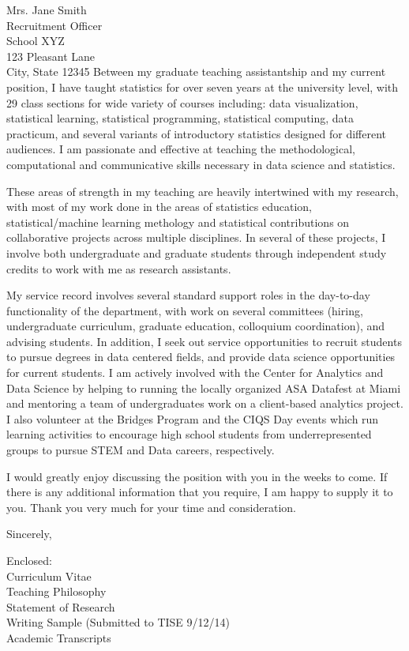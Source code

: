 \documentclass[11pt]{letter}\usepackage[]{graphicx}\usepackage[]{color}
\begin{document}
\begin{letter}{Mrs. Jane Smith \\
Recruitment Officer \\
School XYZ \\
123 Pleasant Lane \\
City, State 12345}
Between my graduate teaching assistantship and my current position,  I have taught statistics for over seven years at the university level, with 29 class sections for wide variety of courses including: data visualization, statistical learning, statistical programming, statistical computing, data practicum, and several variants of introductory statistics designed for different audiences. I am passionate and effective at teaching the methodological, computational and communicative skills necessary in data science and statistics. 

These areas of strength in my teaching are heavily intertwined with my research, with most of my work done in the areas of statistics education, statistical/machine learning methology and statistical contributions on collaborative projects across multiple disciplines. In several of these projects, I involve both undergraduate and graduate students through independent study credits to work with me as research assistants.

My service record involves several standard support roles in the day-to-day functionality of the department, with work on several committees (hiring, undergraduate curriculum, graduate education, colloquium coordination), and advising students. In addition, I seek out service opportunities to recruit students to pursue degrees in data centered fields, and provide data science opportunities for current students. I am actively involved with the Center for Analytics and Data Science by helping to running the locally organized ASA Datafest at Miami and mentoring a team of undergraduates work on a client-based analytics project. I also volunteer at the Bridges Program and the CIQS Day events which run learning activities to encourage high school students from underrepresented groups to pursue STEM and Data careers, respectively. 

I would greatly enjoy discussing the position with you in the weeks to come. If there is any additional information that you require, I am happy to supply it to you. Thank you very much for your time and consideration.

\addtolength{\medskipamount}{-1\medskipamount}
\closing{Sincerely,}


Enclosed:\\
Curriculum Vitae\\
Teaching Philosophy\\
Statement of Research\\
Writing Sample (Submitted to TISE 9/12/14) \\
Academic Transcripts


\end{letter}
\end{document}
